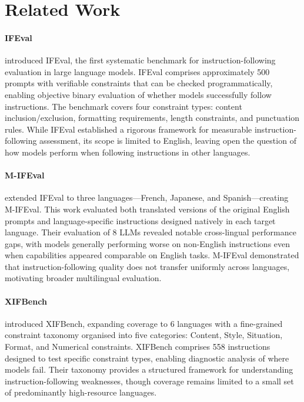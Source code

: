 \documentclass[11pt]{article}
\begin{document}
\section{Related Work}
\label{sec:related-work}

\paragraph{IFEval}
\cite{zhou2023ifeval} introduced IFEval, the first systematic benchmark for instruction-following evaluation in large language models. IFEval comprises approximately 500 prompts with verifiable constraints that can be checked programmatically, enabling objective binary evaluation of whether models successfully follow instructions. The benchmark covers four constraint types: content inclusion/exclusion, formatting requirements, length constraints, and punctuation rules. While IFEval established a rigorous framework for measurable instruction-following assessment, its scope is limited to English, leaving open the question of how models perform when following instructions in other languages.

\paragraph{M-IFEval}
\cite{m-ifeval2025naacl} extended IFEval to three languages---French, Japanese, and Spanish---creating M-IFEval. This work evaluated both translated versions of the original English prompts and language-specific instructions designed natively in each target language. Their evaluation of 8 LLMs revealed notable cross-lingual performance gaps, with models generally performing worse on non-English instructions even when capabilities appeared comparable on English tasks. M-IFEval demonstrated that instruction-following quality does not transfer uniformly across languages, motivating broader multilingual evaluation.

\paragraph{XIFBench}
\cite{li2025xifbench} introduced XIFBench, expanding coverage to 6 languages with a fine-grained constraint taxonomy organised into five categories: Content, Style, Situation, Format, and Numerical constraints. XIFBench comprises 558 instructions designed to test specific constraint types, enabling diagnostic analysis of where models fail. Their taxonomy provides a structured framework for understanding instruction-following weaknesses, though coverage remains limited to a small set of predominantly high-resource languages.
\end{document}
